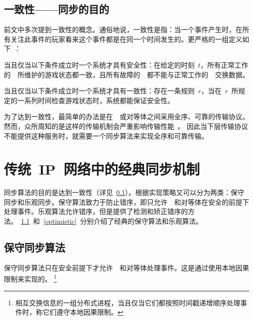 
\subsection{一致性——同步的目的}
\label{def}

前文中多次提到一致性的概念。通俗地说，一致性是指：当一个事件产生时，在所有关注此事件的玩家看来这个事件都是在同一个时间发生的。更严格的一组定义如下~\cite{Ferretti2005}：

\begin{zjudefine} [安全性]
当且仅当以下条件成立时一个系统才具有安全性：在给定的时刻~$t$，所有正常工作的~\gss~所维护的游戏状态都一致，且所有故障的~\gss~都不能与正常工作的~\gss~交换数据。
\end{zjudefine}

\begin{zjudefine} [一致性]
当且仅当以下条件成立时一个系统才具有一致性：存在一条规则~$r$，当在~$r$~所规定的一系列时间检查游戏状态时，系统都能保证安全性。
\end{zjudefine}

为了达到一致性，最简单的办法是在~\gss~或对等体之间采用全序、可靠的传输协议。然而，众所周知的是这样的传输机制会严重影响传输性能~\cite{impact}。 因此当下层传输协议不能提供这种服务时，就需要一个同步算法来实现全序和可靠传输。


\section{传统~IP~网络中的经典同步机制}
\label{traditional}
同步算法的目的是达到一致性（详见~\ref{def}）。根据实现策略又可以分为两类：保守同步和乐观同步。保守算法致力于防止错序，即只允许~\gss~和对等体在安全的前提下处理事件。乐观算法允许错序，但是提供了检测和矫正错序的方法。~\ref{conservative}~和~\ref{optimistic}~分别介绍了经典的保守算法和乐观算法。


\subsection{保守同步算法}
\label{conservative}
保守同步算法只在安全前提下才允许~\gss~和对等体处理事件。这是通过使用本地因果限制来实现的。
\renewcommand\baselinestretch{1} %
\footnote{相互交换信息的一组分布式进程，当且仅当它们都按照时间戳递增顺序处理事件时，称它们遵守本地因果限制。}

